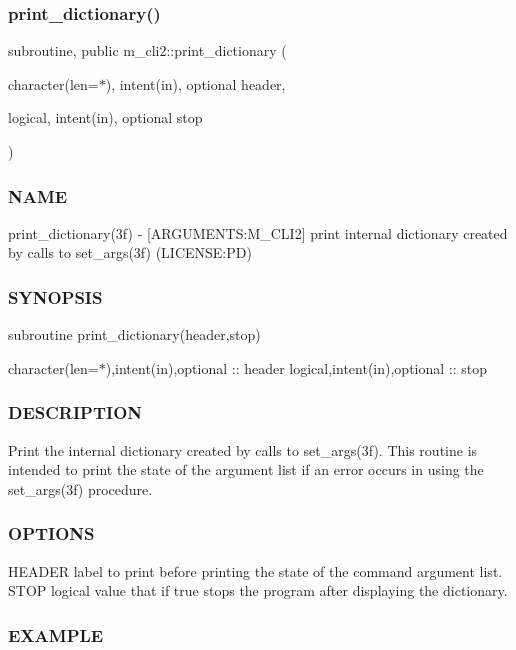 \mbox{\label{namespacem__cli2_af7dc9c4b19e394533df4a8ef42fa111b}} 
\subsubsection{\texorpdfstring{print\+\_\+dictionary()}{print\_dictionary()}}
{\footnotesize\ttfamily subroutine, public m\+\_\+cli2\+::print\+\_\+dictionary (\begin{DoxyParamCaption}\item[{character(len=$\ast$), intent(in), optional}]{header,  }\item[{logical, intent(in), optional}]{stop }\end{DoxyParamCaption})}



\subsubsection*{N\+A\+ME}

print\+\_\+dictionary(3f) -\/ \mbox{[}A\+R\+G\+U\+M\+E\+N\+TS\+:M\+\_\+\+C\+L\+I2\mbox{]} print internal dictionary created by calls to set\+\_\+args(3f) (L\+I\+C\+E\+N\+SE\+:PD) \subsubsection*{S\+Y\+N\+O\+P\+S\+IS}

subroutine print\+\_\+dictionary(header,stop)

character(len=$\ast$),intent(in),optional \+:\+: header logical,intent(in),optional \+:\+: stop \subsubsection*{D\+E\+S\+C\+R\+I\+P\+T\+I\+ON}

Print the internal dictionary created by calls to set\+\_\+args(3f). This routine is intended to print the state of the argument list if an error occurs in using the set\+\_\+args(3f) procedure. \subsubsection*{O\+P\+T\+I\+O\+NS}

H\+E\+A\+D\+ER label to print before printing the state of the command argument list. S\+T\+OP logical value that if true stops the program after displaying the dictionary. \subsubsection*{E\+X\+A\+M\+P\+LE}


